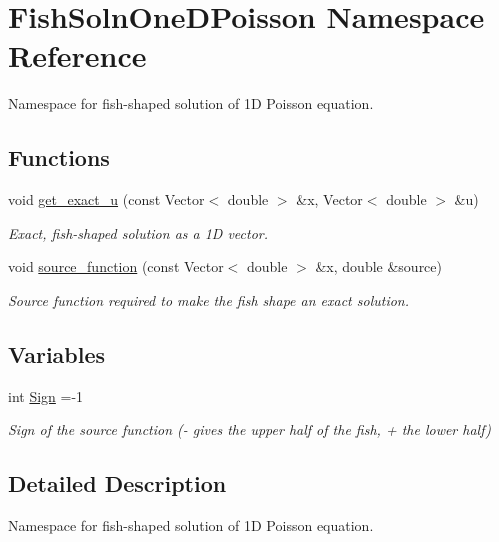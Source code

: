 \hypertarget{namespaceFishSolnOneDPoisson}{}\section{Fish\+Soln\+One\+D\+Poisson Namespace Reference}
\label{namespaceFishSolnOneDPoisson}


Namespace for fish-\/shaped solution of 1D Poisson equation.  


\subsection*{Functions}
\begin{DoxyCompactItemize}
\item 
void \hyperlink{namespaceFishSolnOneDPoisson_a52c9346f567cb68fe20268a592deb4bc}{get\+\_\+exact\+\_\+u} (const Vector$<$ double $>$ \&x, Vector$<$ double $>$ \&u)
\begin{DoxyCompactList}\small\item\em Exact, fish-\/shaped solution as a 1D vector. \end{DoxyCompactList}\item 
void \hyperlink{namespaceFishSolnOneDPoisson_afd2f5aef6b8868526dbf8e74d379697f}{source\+\_\+function} (const Vector$<$ double $>$ \&x, double \&source)
\begin{DoxyCompactList}\small\item\em Source function required to make the fish shape an exact solution. \end{DoxyCompactList}\end{DoxyCompactItemize}
\subsection*{Variables}
\begin{DoxyCompactItemize}
\item 
int \hyperlink{namespaceFishSolnOneDPoisson_a108e814ef887ffcc8caa7c65a7d30f06}{Sign} =-\/1
\begin{DoxyCompactList}\small\item\em Sign of the source function (-\/ gives the upper half of the fish, + the lower half) \end{DoxyCompactList}\end{DoxyCompactItemize}


\subsection{Detailed Description}
Namespace for fish-\/shaped solution of 1D Poisson equation. 

